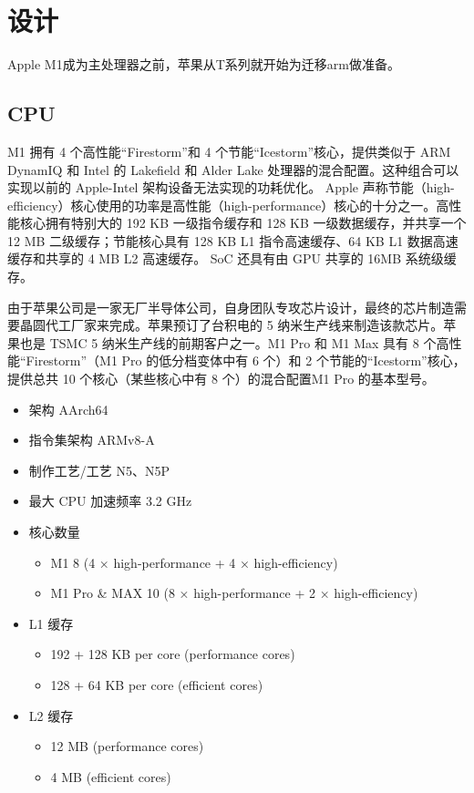 \documentclass[a4paper]{article}
\begin{document}
\section{设计}
Apple M1成为主处理器之前，苹果从T系列就开始为迁移arm做准备。
\subsection{CPU}
M1 拥有 4 个高性能“Firestorm”和 4 个节能“Icestorm”核心，提供类似于 ARM DynamIQ 和 Intel 的 Lakefield 和 Alder Lake 处理器的混合配置。这种组合可以实现以前的 Apple-Intel 架构设备无法实现的功耗优化。 Apple 声称节能（high-efficiency）核心使用的功率是高性能（high-performance）核心的十分之一。高性能核心拥有特别大的 192 KB 一级指令缓存和 128 KB 一级数据缓存，并共享一个 12 MB 二级缓存；节能核心具有 128 KB L1 指令高速缓存、64 KB L1 数据高速缓存和共享的 4 MB L2 高速缓存。 SoC 还具有由 GPU 共享的 16MB 系统级缓存。

由于苹果公司是一家无厂半导体公司，自身团队专攻芯片设计，最终的芯片制造需要晶圆代工厂家来完成。苹果预订了台积电的 5 纳米生产线来制造该款芯片。苹果也是 TSMC 5 纳米生产线的前期客户之一。M1 Pro 和 M1 Max 具有 8 个高性能“Firestorm”（M1 Pro 的低分档变体中有 6 个）和 2 个节能的“Icestorm”核心，提供总共 10 个核心（某些核心中有 8 个）的混合配置M1 Pro 的基本型号。

\begin{itemize}
  \item 架构	AArch64
  \item 指令集架构	ARMv8-A
  \item 制作工艺/工艺	N5、N5P
  \item 最大 CPU 加速频率	3.2 GHz
  \item 核心数量
        \begin{itemize}
          \item M1	8 (4 × high-performance + 4 × high-efficiency)
          \item M1 Pro \& MAX	10 (8 × high-performance + 2 × high-efficiency)
        \end{itemize}
  \item L1 缓存
        \begin{itemize}
          \item 192 + 128 KB per core (performance cores)
          \item 128 + 64 KB per core (efficient cores)
        \end{itemize}
  \item L2 缓存
        \begin{itemize}
          \item 12 MB (performance cores)
          \item 4 MB (efficient cores)
        \end{itemize}
\end{itemize}
\end{document}
